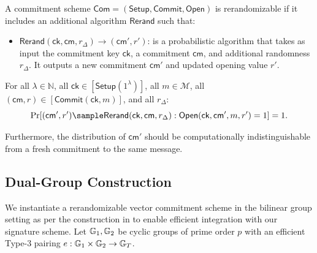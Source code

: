 \begin{definition}[Rerandomizability]
A commitment scheme $\mathsf{Com} = (\mathsf{Setup}, \mathsf{Commit}, \mathsf{Open})$ is rerandomizable if it includes an additional algorithm $\mathsf{Rerand}$ such that:

\begin{itemize}
\item $\mathsf{Rerand}(\mathsf{ck}, \mathsf{cm}, r_\Delta) \rightarrow (\mathsf{cm}', r')$: is a probabilistic algorithm that takes as input the commitment key $\mathsf{ck}$, a commitment $\mathsf{cm}$, and additional randomness $r_\Delta$. It outputs a new commitment $\mathsf{cm}'$ and updated opening value $r'$.
\end{itemize}

For all $\lambda \in \mathbb{N}$, all $\mathsf{ck} \in [\mathsf{Setup}(1^\lambda)]$, all $m \in \mathcal{M}$, all $(\mathsf{cm}, r) \in [\mathsf{Commit}(\mathsf{ck}, m)]$, and all $r_\Delta$:
$$\Pr[(\mathsf{cm}', r') \sample \mathsf{Rerand}(\mathsf{ck}, \mathsf{cm}, r_\Delta) : \mathsf{Open}(\mathsf{ck}, \mathsf{cm}', m, r') = 1] = 1.$$

Furthermore, the distribution of $\mathsf{cm}'$ should be computationally indistinguishable from a fresh commitment to the same message.
\end{definition}


\subsection{Dual-Group Construction}

We instantiate a rerandomizable vector commitment scheme in the bilinear group setting as per the construction in \cite{tomescu2022utt} to enable efficient integration with our signature scheme. Let $\mathbb{G}_1, \mathbb{G}_2$ be cyclic groups of prime order $p$ with an efficient Type-3 pairing $e: \mathbb{G}_1 \times \mathbb{G}_2 \to \mathbb{G}_T$.

